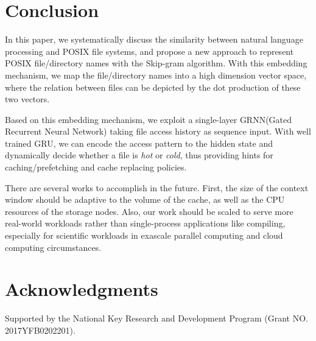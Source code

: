 \documentclass[conference]{IEEEtran}
\begin{document}
\section{Conclusion}
In this paper, we systematically discuss the similarity between natural language processing and POSIX file systems, and propose a new approach to represent POSIX file/directory names with the Skip-gram algorithm. With this embedding mechanism, we map the file/directory names into a high dimension vector space, where the relation between files can be depicted by the dot production of these two vectors.  

Based on this embedding mechanism, we exploit a single-layer GRNN(Gated Recurrent Neural Network) taking file access history as sequence input. With well trained GRU, we can encode the access pattern to the hidden state and dynamically decide whether a file is \textit{hot} or \textit{cold}, thus providing hints for caching/prefetching and cache replacing policies.

There are several works to accomplish in the future. First, the size of the context window should be adaptive to the volume of the cache, as well as the CPU resources of the storage nodes. Also, our work should be scaled to serve more real-world workloads rather than single-process applications like compiling, especially for scientific workloads in exascale parallel computing and cloud computing circumstances.
\section{Acknowledgments}
Supported by the National Key Research and Development Program (Grant NO. 2017YFB0202201).


\end{document}
